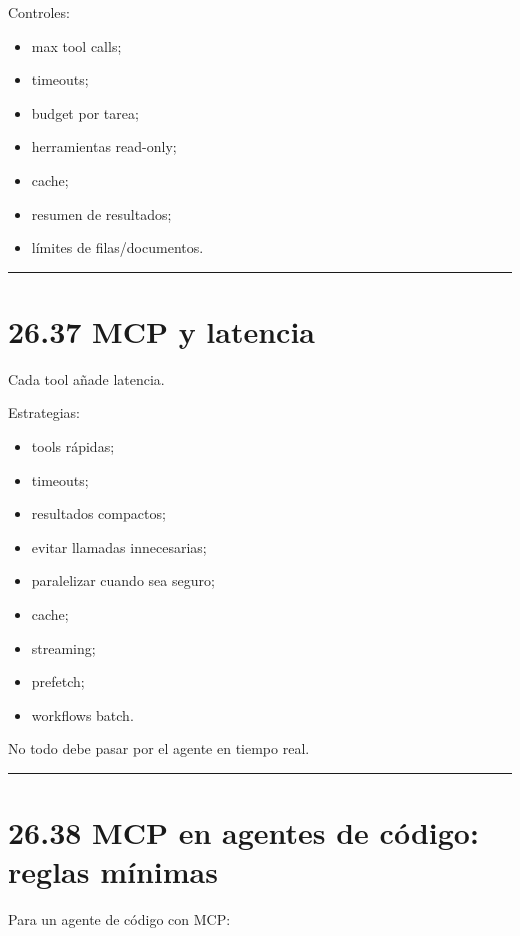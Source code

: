 Controles:

\begin{itemize}
\tightlist
\item
  max tool calls;
\item
  timeouts;
\item
  budget por tarea;
\item
  herramientas read-only;
\item
  cache;
\item
  resumen de resultados;
\item
  límites de filas/documentos.
\end{itemize}

\begin{center}\rule{0.5\linewidth}{0.5pt}\end{center}

\section{26.37 MCP y latencia}\label{mcp-y-latencia}

Cada tool añade latencia.

Estrategias:

\begin{itemize}
\tightlist
\item
  tools rápidas;
\item
  timeouts;
\item
  resultados compactos;
\item
  evitar llamadas innecesarias;
\item
  paralelizar cuando sea seguro;
\item
  cache;
\item
  streaming;
\item
  prefetch;
\item
  workflows batch.
\end{itemize}

No todo debe pasar por el agente en tiempo real.

\begin{center}\rule{0.5\linewidth}{0.5pt}\end{center}

\section{26.38 MCP en agentes de código: reglas
mínimas}\label{mcp-en-agentes-de-cuxf3digo-reglas-muxednimas}

Para un agente de código con MCP:

